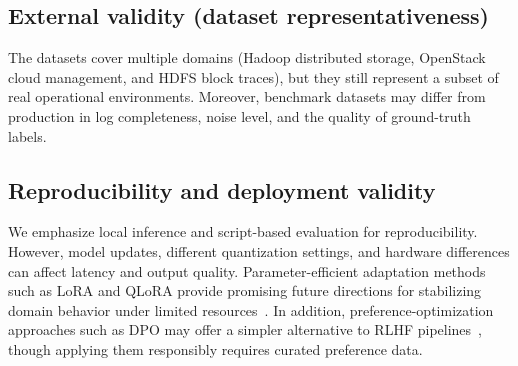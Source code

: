\subsection{External validity (dataset representativeness)}
The datasets cover multiple domains (Hadoop distributed storage, OpenStack cloud management, and
HDFS block traces), but they still represent a subset of real operational environments. Moreover,
benchmark datasets may differ from production in log completeness, noise level, and the quality of
ground-truth labels.

\subsection{Reproducibility and deployment validity}
We emphasize local inference and script-based evaluation for reproducibility. However, model
updates, different quantization settings, and hardware differences can affect latency and output
quality. Parameter-efficient adaptation methods such as LoRA and QLoRA provide promising future
directions for stabilizing domain behavior under limited
resources~\cite{hu2021loralowrankadaptationlarge,dettmers2023qloraefficientfinetuningquantized}.
In addition, preference-optimization approaches such as DPO may offer a simpler alternative to
RLHF pipelines~\cite{rafailov2024directpreferenceoptimizationlanguage}, though applying them
responsibly requires curated preference data.
